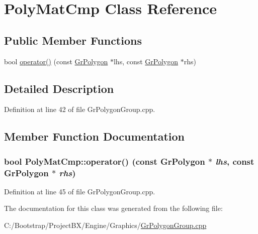 \hypertarget{class_poly_mat_cmp}{
\section{PolyMatCmp Class Reference}
\label{class_poly_mat_cmp}
}
\subsection*{Public Member Functions}
\begin{CompactItemize}
\item 
bool \hyperlink{class_poly_mat_cmp_63a69ce5e6036ba3d601a9e58165a2bf}{operator()} (const \hyperlink{class_gr_polygon}{GrPolygon} $\ast$lhs, const \hyperlink{class_gr_polygon}{GrPolygon} $\ast$rhs)
\end{CompactItemize}


\subsection{Detailed Description}


Definition at line 42 of file GrPolygonGroup.cpp.

\subsection{Member Function Documentation}
\hypertarget{class_poly_mat_cmp_63a69ce5e6036ba3d601a9e58165a2bf}{
\subsubsection[{operator()}]{\setlength{\rightskip}{0pt plus 5cm}bool PolyMatCmp::operator() (const {\bf GrPolygon} $\ast$ {\em lhs}, \/  const {\bf GrPolygon} $\ast$ {\em rhs})}}
\label{class_poly_mat_cmp_63a69ce5e6036ba3d601a9e58165a2bf}




Definition at line 45 of file GrPolygonGroup.cpp.

The documentation for this class was generated from the following file:\begin{CompactItemize}
\item 
C:/Bootstrap/ProjectBX/Engine/Graphics/\hyperlink{_gr_polygon_group_8cpp}{GrPolygonGroup.cpp}\end{CompactItemize}
